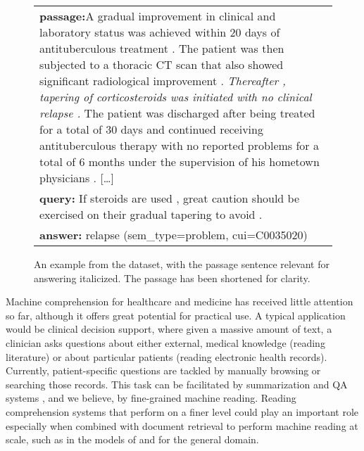 \documentclass[11pt,a4paper]{article}
\begin{document}
\begin{figure}
\small
\begin{tabular}{p{}}
\textbf{passage:}\newline
[\ldots] A gradual improvement in clinical and laboratory status was achieved within 20 days of antituberculous treatment . The patient was then subjected to a thoracic CT scan that also showed significant radiological improvement . \textit{Thereafter , tapering of corticosteroids was initiated with no clinical relapse .} The patient was discharged after being treated for a total of 30 days and continued receiving antituberculous therapy with no reported problems for a total of 6 months under the supervision of his hometown physicians . [\ldots]\\
\textbf{query:}\newline
If steroids are used , great caution should be exercised on their gradual tapering to avoid \underline{\hspace{1cm}} .\\
\textbf{answer:}\newline 
relapse  (sem\_type=problem, cui=C0035020)\\\end{tabular}
\caption{An example from the dataset, with the passage sentence relevant for answering italicized. The passage has been shortened for clarity.}\label{fig:ex}
\end{figure}

Machine comprehension for healthcare and medicine has received little attention so far, although it offers great potential for practical use.
A typical application would be clinical decision support, where given a massive amount of text, a clinician asks questions about either external, medical knowledge (reading literature) or about particular patients (reading electronic health records). Currently, patient-specific questions are tackled by manually browsing or searching those records. This task can be facilitated by summarization and QA systems \citep{DemnerFushmanAndLin2007,DemnerFushmanEtAl2009}, and we believe, by fine-grained machine reading. Reading comprehension systems that perform on a finer level could play an important role especially when combined with document retrieval to perform machine reading at scale, such as in the models of  \citet{ChenEtAl2017} and \citet{WatanabeEtAl2017} for the general domain.
\end{document}
